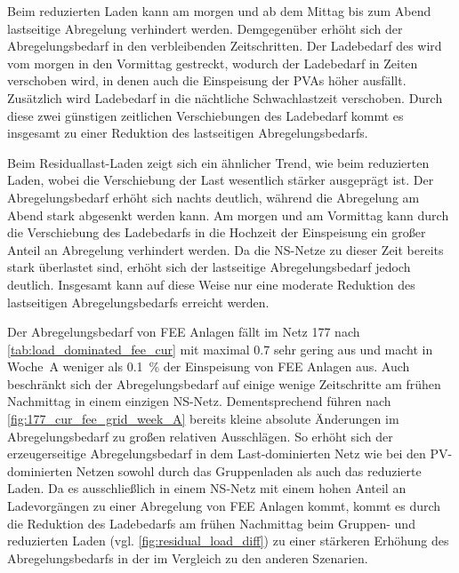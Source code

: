 Beim reduzierten Laden kann am morgen und ab dem Mittag bis zum Abend lastseitige Abregelung verhindert werden.
Demgegenüber erhöht sich der Abregelungsbedarf in den verbleibenden Zeitschritten.
Der Ladebedarf des \UC \Firmeparkplatz wird vom morgen in den Vormittag gestreckt, wodurch der Ladebedarf in Zeiten verschoben wird, in denen auch die Einspeisung der \glspl{PVA} höher ausfällt.
Zusätzlich wird Ladebedarf \zH in die nächtliche Schwachlastzeit verschoben.
Durch diese zwei günstigen zeitlichen Verschiebungen des Ladebedarf kommt es insgesamt zu einer Reduktion des lastseitigen Abregelungsbedarfs.



Beim Residuallast-Laden zeigt sich ein ähnlicher Trend, wie beim reduzierten Laden, wobei die Verschiebung der Last wesentlich stärker ausgeprägt ist.
Der Abregelungsbedarf erhöht sich nachts deutlich, während die Abregelung am Abend stark abgesenkt werden kann.
Am morgen und am Vormittag kann durch die Verschiebung des Ladebedarfs in die Hochzeit der Einspeisung ein großer Anteil an Abregelung verhindert werden.
Da die \gls{NS}-Netze zu dieser Zeit bereits stark überlastet sind, erhöht sich der lastseitige Abregelungsbedarf jedoch deutlich.
Insgesamt kann auf diese Weise nur eine moderate Reduktion des lastseitigen Abregelungsbedarfs erreicht werden.



Der Abregelungsbedarf von \gls{FEE} Anlagen fällt im Netz \num{177} nach \autoref{tab:load_dominated_fee_cur} mit maximal \SI{0.7}{\mwh} sehr gering aus und macht in Woche~A weniger als \SI{0.1}{\percent} der Einspeisung von \gls{FEE} Anlagen aus.
Auch beschränkt sich der Abregelungsbedarf auf einige wenige Zeitschritte am frühen Nachmittag in einem einzigen \gls{NS}-Netz.
Dementsprechend führen nach \autoref{fig:177_cur_fee_grid_week_A} bereits kleine absolute Änderungen im Abregelungsbedarf zu großen relativen Ausschlägen.
So erhöht sich der erzeugerseitige Abregelungsbedarf in dem Last-dominierten Netz wie bei den \gls{PV}-dominierten Netzen sowohl durch das Gruppenladen als auch das reduzierte Laden.
Da es ausschließlich in einem \gls{NS}-Netz mit einem hohen Anteil an Ladevorgängen \zH zu einer Abregelung von \gls{FEE} Anlagen kommt, kommt es durch die Reduktion des Ladebedarfs am frühen Nachmittag beim Gruppen- und reduzierten Laden (vgl. \autoref{fig:residual_load_diff}) zu einer stärkeren Erhöhung des Abregelungsbedarfs in der \SzeFirmenparkplatz im Vergleich zu den anderen Szenarien.

